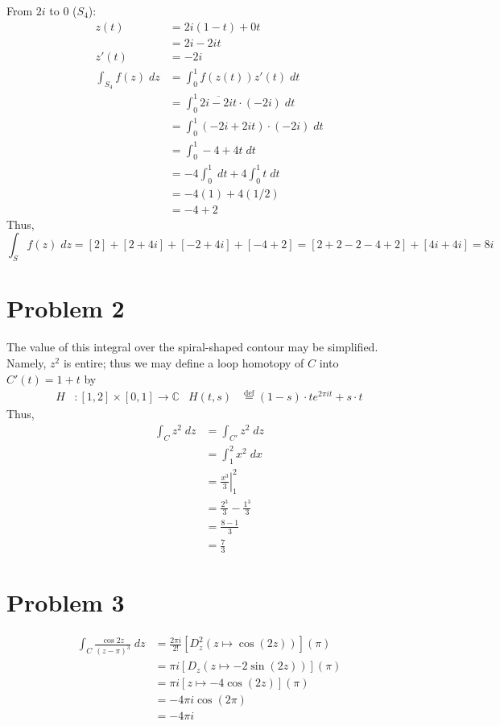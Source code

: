 \documentclass{article}
\theoremstyle{definition}
\newcommand{\Co}{\mathbb{C}}
\newcommand{\sq}[1]{\left[#1\right]}
\begin{document}
From $2i$ to $0$ ($S_4$):
\begin{align*}
z(t) &= 2i(1-t) + 0t \\
&= 2i-2it \\
z'(t) &= -2i \\
\int_{S_4} f(z) \;dz 
&= \int_0^1 f(z(t))z'(t) \;dt \\
&= \int_0^1 \overline{2i-2it} \cdot (-2i) \;dt \\
&= \int_0^1 (-2i+2it) \cdot (-2i) \;dt \\
&= \int_0^1 -4 + 4t \;dt \\
&= -4 \int_0^1 \;dt + 4 \int_0^1 t \;dt \\
&= -4 (1) + 4 (1/2) \\
&= -4 + 2 
\end{align*}
Thus,
\[ 
\int_S f(z)\;dz
= \sq{2} + \sq{2+4i} + \sq{-2+4i} + \sq{-4+2}
= \sq{2+2-2-4+2}+\sq{4i+4i}
= 8i
\]

\section{Problem 2}
The value of this integral over the spiral-shaped contour may be simplified. 
Namely, $z^2$ is entire; thus we may define a loop homotopy of $C$
into $C'(t)=1+t$ by
\begin{align*}
H &: [1,2] \times [0,1] \to \Co  &
H(t,s) &\overset{\text{def}}{=} (1-s) \cdot t e^{2 \pi i t} + s \cdot t
\end{align*}
Thus,
\begin{align*}
\int_C z^2 \;dz
&= \int_{C'} z^2 \;dz \\
&= \int_1^2 x^2 \;dx \\
&= \left.\frac{x^3}{3}\right|_1^2 \\
&= \frac{2^3}{3} - \frac{1^3}{3} \\
&= \frac{8-1}{3} \\
&= \frac{7}{3}
\end{align*}
\section{Problem 3}
\begin{align*}
\int_C \frac{\cos 2z}{(z-\pi)^3} \;dz
&= \frac{2 \pi i}{2!} \sq{D_z^2 (z \mapsto \cos(2z))}(\pi) \\
&= \pi i \sq{D_z (z \mapsto -2\sin(2z))}(\pi) \\
&= \pi i \sq{z \mapsto -4 \cos(2z)}(\pi) \\
&= -4 \pi i \cos(2\pi) \\
&= -4 \pi i
\end{align*}
\end{document}
